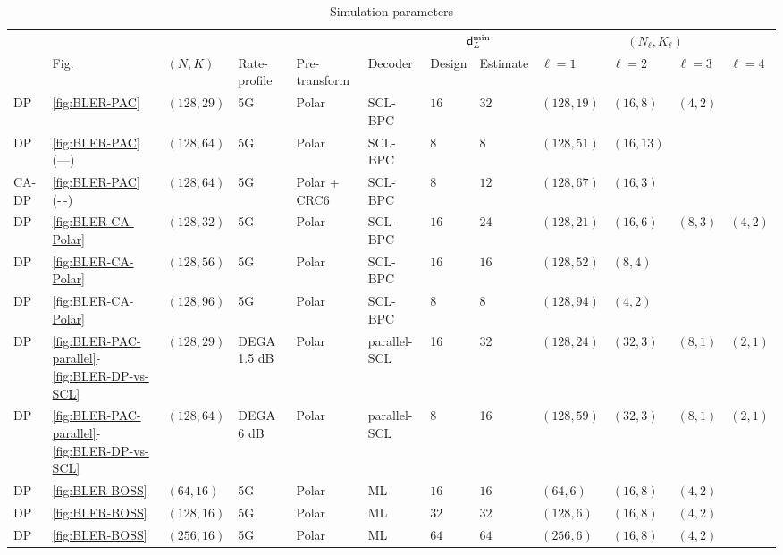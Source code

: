 \documentclass[conference]{IEEEtran}
\begin{document}
\begin{table}
\centering
\caption{Simulation parameters} \label{table:simulation-parameters}
\begin{tabular}{llllllBBBBBB}
\toprule
{} & {} & {} & {} & {} & {} &  &  \\
\cmidrule(lr){7-8}\cmidrule(lr){9-12}
{} & Fig. & {$(N,K)$} & {Rate-profile} & {Pre-transform} & {Decoder} & {Design} & {Estimate} & {$\ell = 1$} & {$\ell = 2$} & {$\ell = 3$} & {$\ell=4$} \\
\midrule
{DP} & \ref{fig:BLER-PAC} &$(128,29)$ & 5G \cite{3gpp-nr-coding} & Polar & SCL-BPC & $16$ & $32$ & $(128,19)$ & $(16,8)$ & $(4,2)$ & {} \\
{DP} & \ref{fig:BLER-PAC} (---) &$(128,64)$ & 5G \cite{3gpp-nr-coding} & Polar & SCL-BPC & $8$ & $8$ & $(128,51)$ & $(16,13)$ & {} & {} \\
{CA-DP} & \ref{fig:BLER-PAC} (-\,-) &$(128,64)$ & 5G \cite{3gpp-nr-coding} & Polar + CRC6 & SCL-BPC & $8$ & $12$ & $(128,67)$ & $(16,3)$ & {} & {} \\
\midrule
{DP} & \ref{fig:BLER-CA-Polar} & $(128,32)$ & 5G \cite{3gpp-nr-coding} & Polar & SCL-BPC & $16$ & $24$ & $(128,21)$ & $(16,6)$ & $(8,3)$ & $(4,2)$ \\
{DP} & \ref{fig:BLER-CA-Polar} &$(128,56)$ & 5G \cite{3gpp-nr-coding} & Polar & SCL-BPC & $16$ & $16$ & $(128,52)$ & $(8,4)$ & {} & {} \\
{DP} & \ref{fig:BLER-CA-Polar} &$(128,96)$ & 5G \cite{3gpp-nr-coding} & Polar & SCL-BPC & $8$ & $8$ & $(128,94)$ & $(4,2)$ & {} & {} \\
\midrule
{DP} & \ref{fig:BLER-PAC-parallel}-\ref{fig:BLER-DP-vs-SCL} &$(128,29)$ & DEGA 1.5 dB & Polar & parallel-SCL & 16 & 32 & $(128,24)$ & $(32,3)$ & $(8,1)$ & $(2,1)$ \\
{DP} & \ref{fig:BLER-PAC-parallel}-\ref{fig:BLER-DP-vs-SCL} &$(128,64)$ & DEGA 6 dB & Polar & parallel-SCL & 8 & 16 & $(128,59)$ & $(32,3)$ & $(8,1)$ & $(2,1)$ \\
\midrule
{DP} & \ref{fig:BLER-BOSS} &$(64,16)$ & 5G \cite{3gpp-nr-coding} & Polar & ML & $16$ & $16$ & $(64,6)$ & $(16,8)$ & $(4,2)$ & {} \\
{DP} & \ref{fig:BLER-BOSS} &$(128,16)$ & 5G \cite{3gpp-nr-coding} & Polar & ML & $32$ & $32$ & $(128,6)$ & $(16,8)$ & $(4,2)$ & {} \\
{DP} & \ref{fig:BLER-BOSS} &$(256,16)$ & 5G \cite{3gpp-nr-coding} & Polar & ML & $64$ & $64$ & $(256,6)$ & $(16,8)$ & $(4,2)$ & {} \\

\end{tabular}
\end{table}
\end{document}
